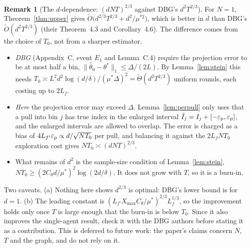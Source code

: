 \documentclass[11pt]{article}
\theoremstyle{definition}
\newtheorem{remark}[theorem]{Remark}
\newcommand{\Xmax}{X_{\max}}
\newcommand{\eps}{\varepsilon}
\begin{document}
\begin{remark}[The $d$-dependence: $(dNT)^{2/3}$ against DBG's $d^2T^{2/3}$]\label{rem:d}
For $N=1$, Theorem~\ref{thm:upper} gives $\tilde O\big(d^{2/3}T^{2/3}+d^2/\mu^{*2}\big)$, which is
better in $d$ than DBG's $\tilde O(d^2T^{2/3})$ (their Theorem~4.3 and Corollary~4.6). The difference comes from the choice of
$T_0$, not from a sharper estimator.
\begin{itemize}[nosep]
\item \emph{DBG} (Appendix~C, event $E_1$ and Lemma~C.4) require the projection error to be at most
half a bin, $\|\hat\theta_0-\theta^*\|_1\le\Delta/(2L)$. By Lemma~\ref{lem:stein} this needs
$T_0\asymp L^2d^2\log(d/\delta)/(\mu^*\Delta)^2=\tilde\Theta(d^2T^{2/3})$ uniform rounds, each
costing up to $2L_f$.
\item \emph{Here} the projection error may exceed $\Delta$. Lemma~\ref{lem:perpull} only uses that
a pull into bin $j$ has true index in the enlarged interval $\tilde I_j=I_j+[-\eps_{\rm p},\eps_{\rm p}]$,
and the enlarged intervals are allowed to overlap. The error is charged as a bias of
$4L_{f'}\eps_{\rm p}\propto d/\sqrt{NT_0}$ per pull, and balancing it against the $2L_f NT_0$
exploration cost gives $NT_0\asymp(dNT)^{2/3}$.
\item What remains of $d^2$ is the sample-size condition of Lemma~\ref{lem:stein},
$NT_0\ge(2C_\theta d/\mu^*)^2\log(2d/\delta)$. It does not grow with $T$, so it is a burn-in.
\end{itemize}
Two caveats. (a) Nothing here shows $d^{2/3}$ is optimal: DBG's lower bound is for $d=1$.
(b) The leading constant is $(L_{f'}\Xmax C_\theta/\mu^*)^{2/3}L_f^{1/3}$, so the improvement
holds only once $T$ is large enough that the burn-in is below $T_0$. Since it also improves the
single-agent result, check it with the DBG authors before stating it as a contribution. This is deferred to future work: the
paper's claims concern $N$, $T$ and the graph, and do not rely on it.
\end{remark}
\end{document}
